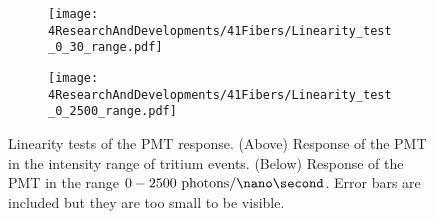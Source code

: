 \begin{figure}
\centering
    \begin{subfigure}[b]{1\textwidth}
    \centering
    \texttt{[image: 4ResearchAndDevelopments/41Fibers/Linearity\_test\_0\_30\_range.pdf]}  
    \caption{\label{subfig:LinearityTritiumRange}}
    \end{subfigure}
    \hfill
    \begin{subfigure}[b]{1\textwidth}
    \centering
    \texttt{[image: 4ResearchAndDevelopments/41Fibers/Linearity\_test\_0\_2500\_range.pdf]}  
    \caption{\label{subfig:LinearityStudyRange}}
    \end{subfigure}
 \caption{Linearity tests of the PMT response. (Above) Response of the PMT in the intensity range of tritium events. (Below) Response of the PMT in the range $0-2500~\text{photons}/\nano\second$. Error bars are included but they are too small to be visible.}
 \label{fig:LinearityRangesOfPMT}
\end{figure}